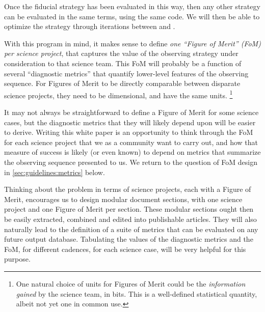 Once the fiducial strategy has
been evaluated in this way, then any other strategy can be evaluated
in the same terms, using the same code.  We will then be able to %
optimize the strategy through iterations between \OpSim and \MAF.

With this program in mind, it makes sense to define {\it one ``Figure
of Merit'' (FoM) per science project}, that captures the value of  the
observing strategy under consideration to that science team. This FoM
will probably be a function of several ``diagnostic metrics'' that quantify
lower-level features of the observing sequence.  For Figures of Merit
to be directly comparable between disparate science projects,  they
need to be dimensional, and have the same units.
\footnote{One natural choice of units for Figures of Merit could be the
{\it information  gained} by the science team, in bits. This is a
well-defined statistical quantity, albeit not yet one in common use.}

It may not always be straightforward to define a Figure of
Merit for some science cases, but the diagnostic metrics that they will likely depend
upon will be easier to derive. Writing this white paper is an
opportunity to think through the FoM for each science
project that we as a community want to carry out, and how that measure
of success is likely (or even known) to depend on metrics that
summarize the observing sequence presented to us. We return to the
question of FoM design in \autoref{sec:guidelines:metrics} below.

Thinking about the problem in terms of science projects, each with a
Figure of Merit, encourages us to design modular document sections, with
one science project and one Figure of Merit per section. These modular
sections ought then be easily extracted, combined and edited into
publishable articles. They will also naturally lead to the definition of
a suite of \MAF metrics that can be evaluated on any future \OpSim output
database.  Tabulating the values of the diagnostic metrics and the FoM,
for different cadences, for each science case, will be very helpful for
this purpose.

